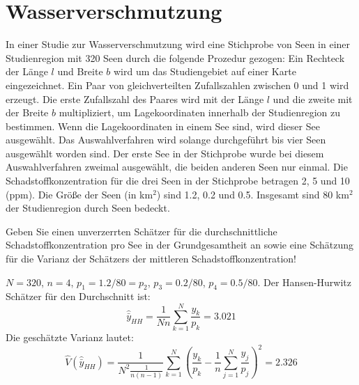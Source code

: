 \documentclass{article}
\begin{document}
\section{Wasserverschmutzung}
In einer Studie zur Wasserverschmutzung wird eine Stichprobe von Seen in einer Studienregion mit 320 Seen durch die folgende
Prozedur gezogen: Ein Rechteck der Länge $l$ und Breite $b$ wird um das Studiengebiet auf einer Karte eingezeichnet.
Ein Paar von gleichverteilten Zufallszahlen zwischen 0 und 1 wird erzeugt. Die erste Zufallszahl des Paares wird mit der
Länge $l$ und die zweite mit der Breite $b$ multipliziert, um Lagekoordinaten innerhalb der Studienregion zu bestimmen.
Wenn die Lagekoordinaten in einem See sind, wird dieser See ausgewählt. Das Auswahlverfahren wird solange durchgeführt bis vier
Seen ausgewählt worden sind. Der erste See in der Stichprobe wurde bei diesem Auswahlverfahren zweimal ausgewählt, die
beiden anderen Seen nur einmal. Die Schadstoffkonzentration für die drei Seen in der Stichprobe betragen 2, 5 und 10 (ppm).
Die Größe der Seen (in km$^2$) sind 1.2, 0.2 und 0.5. Insgesamt sind 80 km$^2$ der Studienregion durch Seen bedeckt.

Geben Sie einen unverzerrten Schätzer für die durchschnittliche Schadstoff\-konzentration pro See in der
Grundgesamtheit an sowie eine Schätzung für die Varianz der Schätzers der mittleren Schadstoffkonzentration!
\begin{solution}
$N=320$, $n=4$, $p_1=1.2/80 = p_2$, $p_3=0.2/80$, $p_4 = 0.5/80$. Der Hansen-Hurwitz Schätzer für den Durchschnitt ist:
$$\hat{\bar{y}}_{HH}=\frac{1}{Nn}\sum_{k=1}^{N} \frac{y_k}{p_k}=3.021$$ Die geschätzte Varianz lautet:
$$\hat{V}(\hat{\bar{y}}_{HH}) = \frac{1}{N^2 \frac{1}{n(n-1)}}\sum_{k=1}^N\left(\frac{y_k}{p_k}-\frac{1}{n}\sum_{j=1}^N \frac{y_j}{p_j}\right)^2 = 2.326$$
\end{solution}
\end{document}
